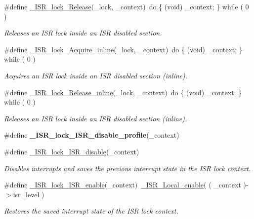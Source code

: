 \begin{DoxyCompactItemize}
\#define \mbox{\hyperlink{group__RTEMSScoreISRLocks_ga35acfee397d43e90bc30f63e4bd960d7}{\+\_\+\+I\+S\+R\+\_\+lock\+\_\+\+Release}}(\+\_\+lock,  \+\_\+context)~do \{ (void) \+\_\+context; \} while ( 0 )
\begin{DoxyCompactList}\small\item\em Releases an I\+SR lock inside an I\+SR disabled section. \end{DoxyCompactList}\item 
\#define \mbox{\hyperlink{group__RTEMSScoreISRLocks_ga78b1ad93f43e74e8155f7cebb539e14b}{\+\_\+\+I\+S\+R\+\_\+lock\+\_\+\+Acquire\+\_\+inline}}(\+\_\+lock,  \+\_\+context)~do \{ (void) \+\_\+context; \} while ( 0 )
\begin{DoxyCompactList}\small\item\em Acquires an I\+SR lock inside an I\+SR disabled section (inline). \end{DoxyCompactList}\item 
\#define \mbox{\hyperlink{group__RTEMSScoreISRLocks_gaa273cf4f280a0cbd05e9b2f4b8321793}{\+\_\+\+I\+S\+R\+\_\+lock\+\_\+\+Release\+\_\+inline}}(\+\_\+lock,  \+\_\+context)~do \{ (void) \+\_\+context; \} while ( 0 )
\begin{DoxyCompactList}\small\item\em Releases an I\+SR lock inside an I\+SR disabled section (inline). \end{DoxyCompactList}\item 
\mbox{\label{group__RTEMSScoreISRLocks_gae9119b4016103d596edcf0e4e3ed9bd4}} 
\#define {\bfseries \+\_\+\+I\+S\+R\+\_\+lock\+\_\+\+I\+S\+R\+\_\+disable\+\_\+profile}(\+\_\+context)
\item 
\#define \mbox{\hyperlink{group__RTEMSScoreISRLocks_ga36d91ceed1df931ce6291d7bc9e60573}{\+\_\+\+I\+S\+R\+\_\+lock\+\_\+\+I\+S\+R\+\_\+disable}}(\+\_\+context)
\begin{DoxyCompactList}\small\item\em Disables interrupts and saves the previous interrupt state in the I\+SR lock context. \end{DoxyCompactList}\item 
\#define \mbox{\hyperlink{group__RTEMSScoreISRLocks_ga2a9af8c6d9bdc4c652759c84df115559}{\+\_\+\+I\+S\+R\+\_\+lock\+\_\+\+I\+S\+R\+\_\+enable}}(\+\_\+context)~\mbox{\hyperlink{group__RTEMSScoreISR_ga508f5a32655cb590906a477b5a8174f1}{\+\_\+\+I\+S\+R\+\_\+\+Local\+\_\+enable}}( ( \+\_\+context )-\/$>$isr\+\_\+level )
\begin{DoxyCompactList}\small\item\em Restores the saved interrupt state of the I\+SR lock context. \end{DoxyCompactList}\end{DoxyCompactItemize}
